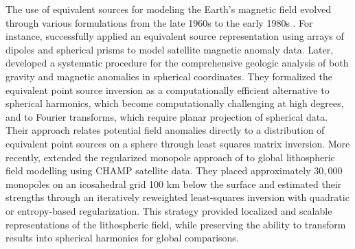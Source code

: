 \documentclass[a4paper,oneside,10pt]{book}
\begin{document}

The use of equivalent sources for modeling the Earth's magnetic field evolved through
various formulations from the late 1960s to the early 1980s
\citep{Alldredge1969, Mayhew1979, Mayhew1980, Reilly1978, Mayhew1982}.
For instance, \citet{Mayhew1979} successfully applied an equivalent source
representation using arrays of dipoles and spherical prisms to model
satellite magnetic anomaly data. Later,
\citet{VonFrese1981} developed a systematic procedure for the comprehensive
geologic analysis of both gravity and magnetic anomalies in spherical
coordinates. They formalized the equivalent point source inversion as a
computationally efficient alternative to spherical harmonics, which become
computationally challenging at high degrees, and to Fourier transforms, which require planar
projection of spherical data. Their approach relates potential field anomalies
directly to a distribution of equivalent point sources on a sphere through
least squares matrix inversion.
More recently, \citet{Kother2015} extended the regularized monopole
approach of \citet{Obrien1994} to global lithospheric field modelling
using CHAMP satellite data. They placed approximately $30,000$ monopoles on
an icosahedral grid 100 km below the surface and estimated their
strengths through an iteratively reweighted least-squares inversion with
quadratic or entropy-based regularization. This strategy provided
localized and scalable representations of the lithospheric field, while
preserving the ability to transform results into spherical harmonics for
global comparisons.
\end{document}
